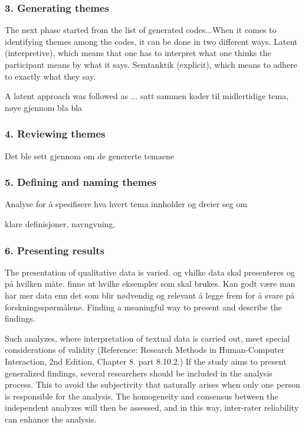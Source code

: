     \subsubsection{3. Generating themes}
The next phase started from the list of generated codes...When it comes to identifying themes among the codes, it can be done in two different ways. Latent (interpretive), which means that one has to interpret what one thinks the participant means by what it says. Semtanktik (explicit), which means to adhere to exactly what they say. 
    
    A latent approach was followed as ...
    satt sammen koder til midlertidige tema, nøye gjennom bla bla 

    \subsubsection{4. Reviewing themes}
Det ble sett gjennom om de genererte temaene 

    \subsubsection{5. Defining and naming themes}
Analyse for å spesifisere hva hvert tema innholder og dreier seg om

klare definisjoner, navngvning, 
    
    \subsubsection{6. Presenting results}
    The presentation of qualitative data is varied. og vhilke data skal presenteres og på hvilken måte. finne ut hvilke eksempler som skal brukes. Kan godt være man har mer data enn det som blir nødvendig og relevant å legge frem for å svare på forskningsspørmålene. 
    Finding a meaningful way to present and describe the findings. 

Such analyzes, where interpretation of textual data is carried out, meet special considerations of validity (Reference: Research Methods in Human-Computer Interaction, 2nd Edition, Chapter 8. part 8.10.2.) If the study aims to present generalized findings, several researchers should be included in the analysis process. This to avoid the subjectivity that naturally arises when only one person is responsible for the analysis. The homogeneity and consensus between the independent analyzes will then be assessed, and in this way, inter-rater reliability can enhance the analysis.

